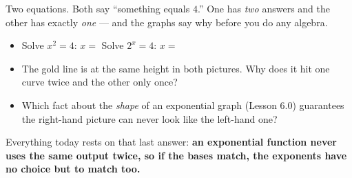 \documentclass[10pt]{article}
\newcommand{\lgrid}[4]{%
  \draw[step=1, linegray!40, very thin] (#1,#3) grid (#2,#4);
  \draw[->, semithick, charcoal] (#1,0)--(#2,0) node[below right, font=\scriptsize]{$x$};
  \draw[->, semithick, charcoal] (0,#3)--(0,#4) node[left, font=\scriptsize]{$y$};}
\newcommand{\expgraph}[6]{\draw[very thick, forest, domain=#5:#6, samples=140, smooth]
  plot (\x,{(#1)*exp((#2)*((\x)-(#3)))+(#4)});}
\newcommand{\solline}[3]{\draw[goldacc, very thick] (#1,#3)--(#2,#3);}
\begin{document}
\begin{hookbox}
\begin{minipage}{\linewidth}
Two equations. Both say ``something equals $4$.'' One has \emph{two} answers and the other has exactly
\emph{one} --- and the graphs say why before you do any algebra.
\begin{center}
\end{center}
\end{minipage}
\vspace{4pt}
\begin{itemize}\setlength{\itemsep}{1pt}
  \item Solve $x^{2}=4$: \; $x=$ \blank{2.2cm} \qquad Solve $2^{x}=4$: \; $x=$ \blank{2.2cm}
  \item The gold line is at the same height in both pictures. Why does it hit one curve twice and the other only once? \writeline
  \item Which fact about the \emph{shape} of an exponential graph (Lesson 6.0) guarantees the right-hand picture can never look like the left-hand one? \writeline
\end{itemize}
Everything today rests on that last answer: \textbf{an exponential function never uses the same output
twice, so if the bases match, the exponents have no choice but to match too.}
\end{hookbox}
\end{document}
